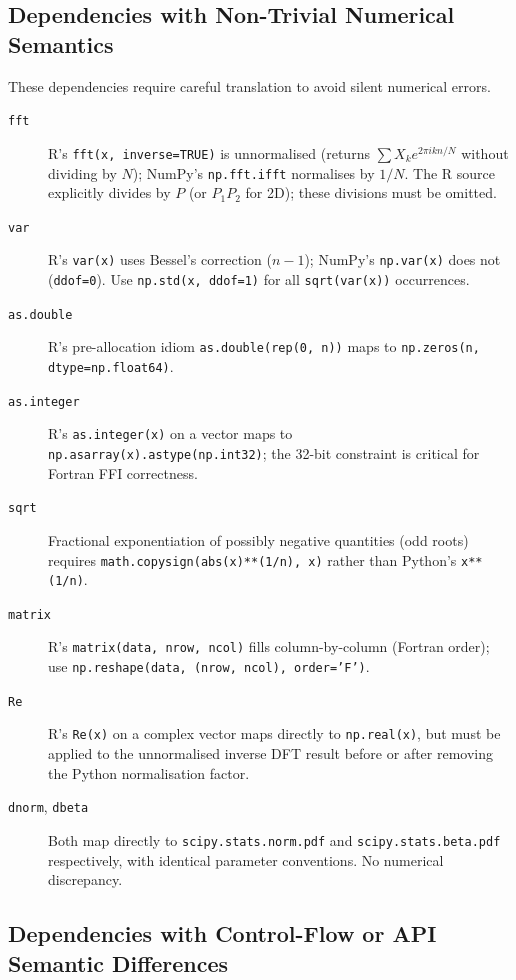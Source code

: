 \documentclass[12pt,a4paper]{article}
\begin{document}
\subsection{Dependencies with Non-Trivial Numerical Semantics}

These dependencies require careful translation to avoid silent numerical errors.

\begin{description}
\item[\texttt{fft}] R's \texttt{fft(x, inverse=TRUE)} is unnormalised (returns $\sum X_k e^{2\pi ikn/N}$ without dividing by $N$); NumPy's \texttt{np.fft.ifft} normalises by $1/N$. The R source explicitly divides by $P$ (or $P_1 P_2$ for 2D); these divisions must be omitted.
\item[\texttt{var}] R's \texttt{var(x)} uses Bessel's correction ($n-1$); NumPy's \texttt{np.var(x)} does not (\texttt{ddof=0}). Use \texttt{np.std(x, ddof=1)} for all \texttt{sqrt(var(x))} occurrences.
\item[\texttt{as.double}] R's pre-allocation idiom \texttt{as.double(rep(0, n))} maps to \texttt{np.zeros(n, dtype=np.float64)}.
\item[\texttt{as.integer}] R's \texttt{as.integer(x)} on a vector maps to \texttt{np.asarray(x).astype(np.int32)}; the 32-bit constraint is critical for Fortran FFI correctness.
\item[\texttt{sqrt}] Fractional exponentiation of possibly negative quantities (odd roots) requires \texttt{math.copysign(abs(x)**(1/n), x)} rather than Python's \texttt{x**(1/n)}.
\item[\texttt{matrix}] R's \texttt{matrix(data, nrow, ncol)} fills column-by-column (Fortran order); use \texttt{np.reshape(data, (nrow, ncol), order='F')}.
\item[\texttt{Re}] R's \texttt{Re(x)} on a complex vector maps directly to \texttt{np.real(x)}, but must be applied to the unnormalised inverse DFT result before or after removing the Python normalisation factor.
\item[\texttt{dnorm}, \texttt{dbeta}] Both map directly to \texttt{scipy.stats.norm.pdf} and \texttt{scipy.stats.beta.pdf} respectively, with identical parameter conventions. No numerical discrepancy.
\end{description}

\subsection{Dependencies with Control-Flow or API Semantic Differences}
\end{document}
